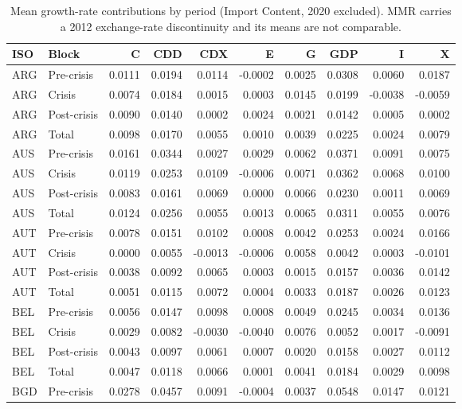
\begin{longtable}[t]{llrrrrrrrr}
\caption{\label{tab:TAB-PERIOD-MEANS}Mean growth-rate contributions by period (Import Content, 2020 excluded). MMR carries a 2012 exchange-rate discontinuity and its means are not comparable.}\\
\toprule
ISO & Block & C & CDD & CDX & E & G & GDP & I & X\\
\midrule
ARG & Pre-crisis & 0.0111 & 0.0194 & 0.0114 & -0.0002 & 0.0025 & 0.0308 & 0.0060 & 0.0187\\
ARG & Crisis & 0.0074 & 0.0184 & 0.0015 & 0.0003 & 0.0145 & 0.0199 & -0.0038 & -0.0059\\
ARG & Post-crisis & 0.0090 & 0.0140 & 0.0002 & 0.0024 & 0.0021 & 0.0142 & 0.0005 & 0.0002\\
ARG & Total & 0.0098 & 0.0170 & 0.0055 & 0.0010 & 0.0039 & 0.0225 & 0.0024 & 0.0079\\
AUS & Pre-crisis & 0.0161 & 0.0344 & 0.0027 & 0.0029 & 0.0062 & 0.0371 & 0.0091 & 0.0075\\
\addlinespace
AUS & Crisis & 0.0119 & 0.0253 & 0.0109 & -0.0006 & 0.0071 & 0.0362 & 0.0068 & 0.0100\\
AUS & Post-crisis & 0.0083 & 0.0161 & 0.0069 & 0.0000 & 0.0066 & 0.0230 & 0.0011 & 0.0069\\
AUS & Total & 0.0124 & 0.0256 & 0.0055 & 0.0013 & 0.0065 & 0.0311 & 0.0055 & 0.0076\\
AUT & Pre-crisis & 0.0078 & 0.0151 & 0.0102 & 0.0008 & 0.0042 & 0.0253 & 0.0024 & 0.0166\\
AUT & Crisis & 0.0000 & 0.0055 & -0.0013 & -0.0006 & 0.0058 & 0.0042 & 0.0003 & -0.0101\\
\addlinespace
AUT & Post-crisis & 0.0038 & 0.0092 & 0.0065 & 0.0003 & 0.0015 & 0.0157 & 0.0036 & 0.0142\\
AUT & Total & 0.0051 & 0.0115 & 0.0072 & 0.0004 & 0.0033 & 0.0187 & 0.0026 & 0.0123\\
BEL & Pre-crisis & 0.0056 & 0.0147 & 0.0098 & 0.0008 & 0.0049 & 0.0245 & 0.0034 & 0.0136\\
BEL & Crisis & 0.0029 & 0.0082 & -0.0030 & -0.0040 & 0.0076 & 0.0052 & 0.0017 & -0.0091\\
BEL & Post-crisis & 0.0043 & 0.0097 & 0.0061 & 0.0007 & 0.0020 & 0.0158 & 0.0027 & 0.0112\\
\addlinespace
BEL & Total & 0.0047 & 0.0118 & 0.0066 & 0.0001 & 0.0041 & 0.0184 & 0.0029 & 0.0098\\
BGD & Pre-crisis & 0.0278 & 0.0457 & 0.0091 & -0.0004 & 0.0037 & 0.0548 & 0.0147 & 0.0121\\

\end{longtable}
